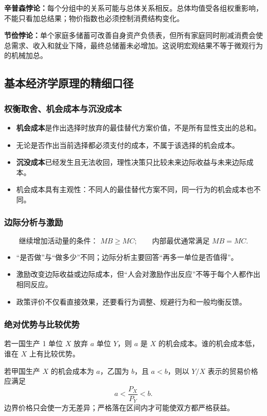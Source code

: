 \documentclass[UTF8,11pt,a4paper]{ctexart}
\newcommand{\term}[1]{\textbf{#1}}
\begin{document}
\begin{detailbox}[两个容易被考细的例子]
\term{辛普森悖论：}每个分组中的关系可能与总体关系相反。总体均值受各组权重影响，不能只看加总结果；物价指数也必须控制消费结构变化。\par
\term{节俭悖论：}单个家庭多储蓄可改善自身资产负债表，但所有家庭同时削减消费会使总需求、收入和就业下降，最终总储蓄未必增加。这说明宏观结果不等于微观行为的机械加总。
\end{detailbox}

\subsection{基本经济学原理的精细口径}
\subsubsection{权衡取舍、机会成本与沉没成本}
\begin{itemize}
  \item \term{机会成本}是作出选择时放弃的最佳替代方案价值，不是所有显性支出的总和。
  \item 无论是否作出当前选择都必须支付的成本，不属于该选择的机会成本。
  \item \term{沉没成本}已经发生且无法收回，理性决策只比较未来边际收益与未来边际成本。
  \item 机会成本具有主观性：不同人的最佳替代方案不同，同一行为的机会成本也不同。
\end{itemize}

\subsubsection{边际分析与激励}
\[
\text{继续增加活动量的条件： } MB\ge MC;
\qquad \text{内部最优通常满足 }MB=MC.
\]
\begin{itemize}
  \item “是否做”与“做多少”不同；边际分析主要回答“再多一单位是否值得”。
  \item 激励改变边际收益或边际成本，但“人会对激励作出反应”不等于每个人都作出相同反应。
  \item 政策评价不仅看直接效果，还要看行为调整、规避行为和一般均衡反馈。
\end{itemize}

\subsubsection{绝对优势与比较优势}
若一国生产 1 单位 $X$ 放弃 $a$ 单位 $Y$，则 $a$ 是 $X$ 的机会成本。谁的机会成本低，谁在 $X$ 上有比较优势。
\begin{formulabox}[贸易互利条件]
若甲国生产 $X$ 的机会成本为 $a$，乙国为 $b$，且 $a<b$，则以 $Y/X$ 表示的贸易价格应满足
\[
a<\frac{P_X}{P_Y}<b.
\]
边界价格只会使一方无差异；严格落在区间内才可能使双方都严格获益。
\end{formulabox}
\end{document}
